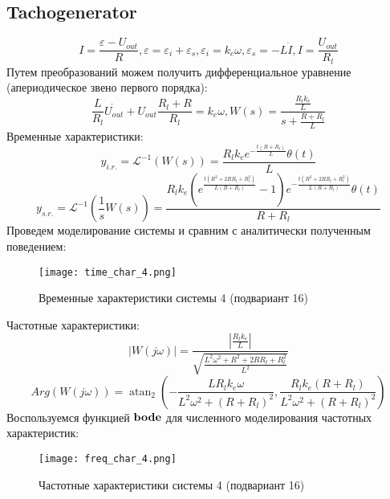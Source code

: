 \subsection*{Tachogenerator}
\begin{equation}
    I = \frac{\varepsilon - U_{out}}{R}, \varepsilon = \varepsilon_i + \varepsilon_s, \varepsilon_i=k_e\omega, \varepsilon_s = -L\dot{I}, I = \frac{U_{out}}{R_l}
\end{equation}
Путем преобразований можем получить дифференциальное уравнение (апериодическое звено первого порядка):
\begin{equation*}
    \frac{L}{R_l}\dot{U_{out}} + U_{out}\frac{R_l + R}{R_l} = k_e\omega, W(s) = \frac{\frac{R_lk_e}{L}}{s+\frac{R+R_l}{L}}
\end{equation*}
Временные характеристики:
\begin{equation*}
    y_{i.r.}=\mathcal{L}^{-1}(W(s)) = \frac{R_{l} k_{e} e^{- \frac{t (R + R_{l})}{L}} \theta(t)}{L}
\end{equation*}
\begin{equation*}
    y_{s.r.}=\mathcal{L}^{-1}(\frac{1}{s}W(s)) = \frac{R_{l} k_{e} (e^{\frac{t (R^{2} + 2 R R_{l} + R_{l}^{2})}{L (R + R_{l})}} - 1) e^{- \frac{t (R^{2} + 2 R R_{l} + R_{l}^{2})}{L (R + R_{l})}} \theta(t)}{R + R_{l}}
\end{equation*}
Проведем моделирование системы и сравним с аналитически полученным поведением:
\begin{figure}[h]
    \centering
    \texttt{[image: time\_char\_4.png]}
    \caption{\label{fig:The-caption-1}Временные характеристики системы 4 (подвариант 16)}
\end{figure}

Частотные характеристики:
\begin{equation*}
    |W(j\omega)| = \frac{|{\frac{R_{l} k_{e}}{L}}|}{\sqrt{\frac{L^{2} \omega^{2} + R^{2} + 2 R R_{l} + R_{l}^{2}}{L^{2}}}}
\end{equation*}
\begin{equation*}
    Arg(W(j\omega)) = \operatorname{atan}_{2}{(- \frac{L R_{l} k_{e} \omega}{L^{2} \omega^{2} + (R + R_{l})^{2}},\frac{R_{l} k_{e} (R + R_{l})}{L^{2} \omega^{2} + (R + R_{l})^{2}} )}
\end{equation*}
Воспользуемся функцией $\bold{bode}$ для численного моделирования частотных характеристик:
\begin{figure}[]
    \centering
    \texttt{[image: freq\_char\_4.png]}
    \caption{\label{fig:The-caption-1}Частотные характеристики системы 4 (подвариант 16)}
\end{figure}
\pagebreak


